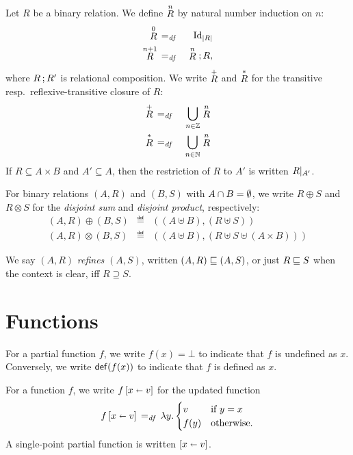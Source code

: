 \documentclass[11pt]{report}
\begin{document}
Let $R$ be a binary relation. We define $\relexp{R}{n}$ by natural number induction on $n$: \begin{eqnarray*}
	\relexp{R}{0} & \eqdef & \mathrm{Id}_{\relset{R}} \\
	\relexp{R}{n + 1} & \eqdef & \relexp{R}{n} \seq R,
\end{eqnarray*} where $R \seq R'$ is relational composition. We write $\tcl{R}$ and $\rtcl{R}$ for the transitive resp.~reflexive-transitive closure of $R$: \begin{eqnarray*}
	\tcl{R} & \eqdef & \bigcup_{n \in \setintegers} \relexp{R}{n} \\
	\rtcl{R} & \eqdef & \bigcup_{n \in \setnaturals} \relexp{R}{n} 
\end{eqnarray*} If $R \subseteq A \times B$ and $A' \subseteq A$, then the restriction of $R$ to $A'$ is written $\restrict{R}{A'}$.

For binary relations $(A,R)$ and $(B,S)$ with $A \cap B = \nil$, we write $R \oplus S$ and $R \otimes S$ for the \emph{disjoint sum} and \emph{disjoint product}, respectively: \begin{eqnarray*}
	(A,R) \oplus (B,S) & \eqdef & ((A \uplus B), (R \uplus S)) \\
	(A,R) \otimes (B,S) & \eqdef & ((A \uplus B), (R \uplus S \uplus (A \times B)))
\end{eqnarray*}

We say $(A,R)$ \emph{refines} $(A,S)$, written $(A,R)\refines(A,S)$, or just $R \refines S$ when the context is clear, iff $R \supseteq S$.  


\section{Functions} %
\label{sec:functions}

For a partial function $f$, we write $f(x) = \bot$ to indicate that $f$ is undefined as $x$. Conversely, we write $\defined{f(x)}$ to indicate that $f$ is defined as $x$. 

For a function $f$, we write $\funup{f}{\ptup{x}{v}}$ for the updated function \begin{equation}
	\label{eq:funup}
	\funup{f}{\ptup{x}{v}} \eqdef \lambda y . \begin{cases}
		v & \text{if $y = x$} \\
		f(y) & \text{otherwise.} 
	\end{cases}
\end{equation} A single-point partial function is written $\funup{}{\ptup{x}{v}}$. 
\end{document}
